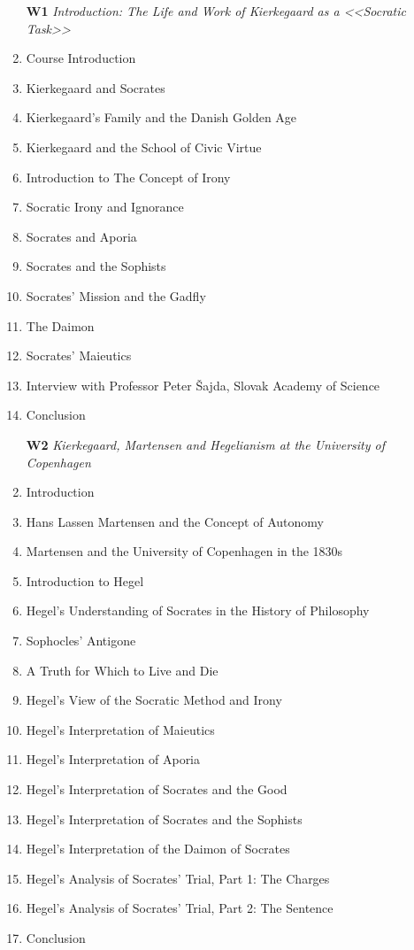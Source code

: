 \documentclass[a4paper]{article}
\begin{document}
\newpage
\small
\begin{multicols}{2}
\begin{enumerate}
\item[\bf W1] \textsl{Introduction: The Life and Work of Kierkegaard as a <<Socratic Task>>}
\item  Course Introduction
\item  Kierkegaard and Socrates
\item  Kierkegaard’s Family and the Danish Golden Age
\item  Kierkegaard and the School of Civic Virtue
\item  Introduction to The Concept of Irony
\item  Socratic Irony and Ignorance
\item  Socrates and Aporia
\item  Socrates and the Sophists
\item  Socrates’ Mission and the Gadfly
\item The Daimon
\item Socrates’ Maieutics
\item Interview with Professor Peter Šajda, Slovak Academy of Science
\item Conclusion
\end{enumerate}

\begin{enumerate}
\item[\bf W2] \textsl{Kierkegaard, Martensen and Hegelianism at the University of Copenhagen}
\item  Introduction
\item  Hans Lassen Martensen and the Concept of Autonomy
\item  Martensen and the University of Copenhagen in the 1830s
\item  Introduction to Hegel
\item  Hegel’s Understanding of Socrates in the History of Philosophy
\item  Sophocles’ Antigone
\item  A Truth for Which to Live and Die
\item  Hegel’s View of the Socratic Method and Irony
\item  Hegel’s Interpretation of Maieutics
\item  Hegel’s Interpretation of Aporia
\item  Hegel’s Interpretation of Socrates and the Good
\item  Hegel’s Interpretation of Socrates and the Sophists
\item  Hegel’s Interpretation of the Daimon of Socrates
\item  Hegel’s Analysis of Socrates’ Trial, Part 1: The Charges
\item  Hegel’s Analysis of Socrates’ Trial, Part 2: The Sentence
\item  Conclusion
\end{enumerate}


\end{multicols}
\end{document}
